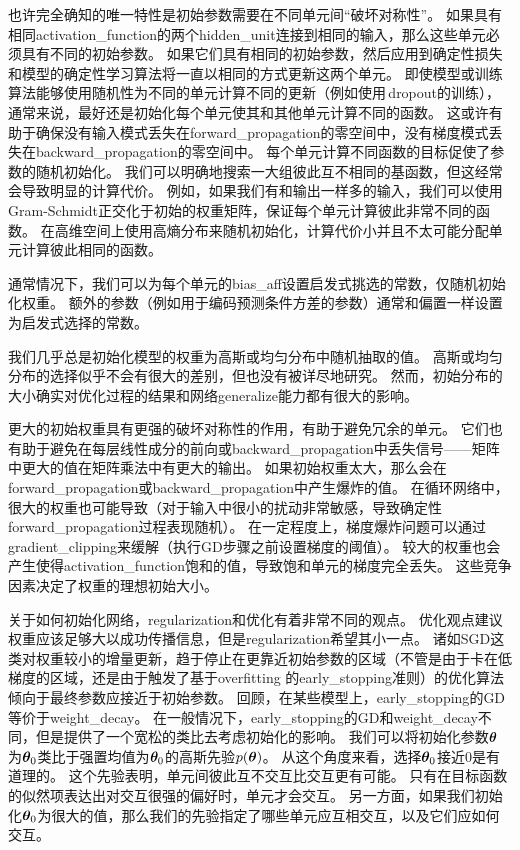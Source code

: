 
也许完全确知的唯一特性是初始参数需要在不同单元间``破坏对称性''。
如果具有相同\gls{activation_function}的两个\gls{hidden_unit}连接到相同的输入，那么这些单元必须具有不同的初始参数。
如果它们具有相同的初始参数，然后应用到确定性损失和模型的确定性学习算法将一直以相同的方式更新这两个单元。
即使模型或训练算法能够使用随机性为不同的单元计算不同的更新（例如使用\,\gls{dropout}的训练），通常来说，最好还是初始化每个单元使其和其他单元计算不同的函数。
这或许有助于确保没有输入模式丢失在\gls{forward_propagation}的零空间中，没有梯度模式丢失在\gls{backward_propagation}的零空间中。
每个单元计算不同函数的目标促使了参数的随机初始化。
我们可以明确地搜索一大组彼此互不相同的基函数，但这经常会导致明显的计算代价。  
例如，如果我们有和输出一样多的输入，我们可以使用Gram-Schmidt正交化于初始的权重矩阵，保证每个单元计算彼此非常不同的函数。
在高维空间上使用高熵分布来随机初始化，计算代价小并且不太可能分配单元计算彼此相同的函数。


通常情况下，我们可以为每个单元的\gls{bias_aff}设置启发式挑选的常数，仅随机初始化权重。
额外的参数（例如用于编码预测条件方差的参数）通常和偏置一样设置为启发式选择的常数。


我们几乎总是初始化模型的权重为高斯或均匀分布中随机抽取的值。
高斯或均匀分布的选择似乎不会有很大的差别，但也没有被详尽地研究。
然而，初始分布的大小确实对优化过程的结果和网络\gls{generalize}能力都有很大的影响。


更大的初始权重具有更强的破坏对称性的作用，有助于避免冗余的单元。
它们也有助于避免在每层线性成分的前向或\gls{backward_propagation}中丢失信号——矩阵中更大的值在矩阵乘法中有更大的输出。
如果初始权重太大，那么会在\gls{forward_propagation}或\gls{backward_propagation}中产生爆炸的值。
在循环网络中，很大的权重也可能导致（对于输入中很小的扰动非常敏感，导致确定性\gls{forward_propagation}过程表现随机）。
在一定程度上，梯度爆炸问题可以通过\gls{gradient_clipping}来缓解（执行\gls{GD}步骤之前设置梯度的阈值）。
较大的权重也会产生使得\gls{activation_function}饱和的值，导致饱和单元的梯度完全丢失。
这些竞争因素决定了权重的理想初始大小。


关于如何初始化网络，\gls{regularization}和优化有着非常不同的观点。
优化观点建议权重应该足够大以成功传播信息，但是\gls{regularization}希望其小一点。
诸如\gls{SGD}这类对权重较小的增量更新，趋于停止在更靠近初始参数的区域（不管是由于卡在低梯度的区域，还是由于触发了基于\gls{overfitting} 的\gls{early_stopping}准则）的优化算法倾向于最终参数应接近于初始参数。
回顾，在某些模型上，\gls{early_stopping}的\gls{GD}等价于\gls{weight_decay}。
在一般情况下，\gls{early_stopping}的\gls{GD}和\gls{weight_decay}不同，但是提供了一个宽松的类比去考虑初始化的影响。
我们可以将初始化参数$\boldsymbol{\theta}$为$\boldsymbol{\theta}_0$类比于强置均值为$\boldsymbol{\theta}_0$的高斯先验$p(\boldsymbol{\theta})$。
从这个角度来看，选择$\boldsymbol{\theta}_0$接近$0$是有道理的。
这个先验表明，单元间彼此互不交互比交互更有可能。
只有在目标函数的似然项表达出对交互很强的偏好时，单元才会交互。
另一方面，如果我们初始化$\boldsymbol{\theta}_0$为很大的值，那么我们的先验指定了哪些单元应互相交互，以及它们应如何交互。


